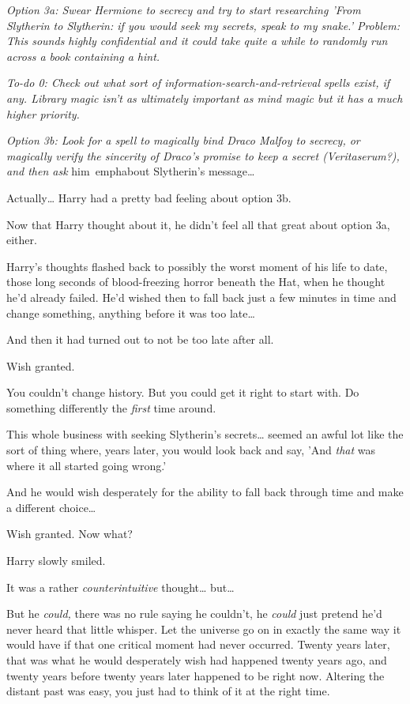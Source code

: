 \emph{Option 3a: Swear Hermione to secrecy and try to start researching 'From 
Slytherin to Slytherin: if you would seek my secrets, speak to my snake.' 
Problem: This sounds highly confidential and it could take quite a while to 
randomly run across a book containing a hint.}

\emph{To-do 0: Check out what sort of information-search-and-retrieval spells 
exist, if any. Library magic isn't as ultimately important as mind magic but it 
has a much higher priority.}

\emph{Option 3b: Look for a spell to magically bind Draco Malfoy to secrecy, or 
magically verify the sincerity of Draco's promise to keep a secret 
(Veritaserum?), and then ask} him\ emph{about Slytherin's message{\ldots}}

Actually{\ldots} Harry had a pretty bad feeling about option 3b.

Now that Harry thought about it, he didn't feel all that great about option 3a, 
either.

Harry's thoughts flashed back to possibly the worst moment of his life to date, 
those long seconds of blood-freezing horror beneath the Hat, when he thought 
he'd already failed. He'd wished then to fall back just a few minutes in time 
and change something, anything before it was too late{\ldots}

And then it had turned out to not be too late after all.

Wish granted.

You couldn't change history. But you could get it right to start with. Do 
something differently the \emph{first} time around.

This whole business with seeking Slytherin's secrets{\ldots} seemed an awful 
lot like the sort of thing where, years later, you would look back and say, 
'And \emph{that} was where it all started going wrong.'

And he would wish desperately for the ability to fall back through time and 
make a different choice{\ldots}

Wish granted. Now what?

Harry slowly smiled.

It was a rather \emph{counterintuitive} thought{\ldots} but{\ldots}

But he \emph{could,} there was no rule saying he couldn't, he \emph{could} just 
pretend he'd never heard that little whisper. Let the universe go on in exactly 
the same way it would have if that one critical moment had never occurred. 
Twenty years later, that was what he would desperately wish had happened twenty 
years ago, and twenty years before twenty years later happened to be right now. 
Altering the distant past was easy, you just had to think of it at the right 
time.


